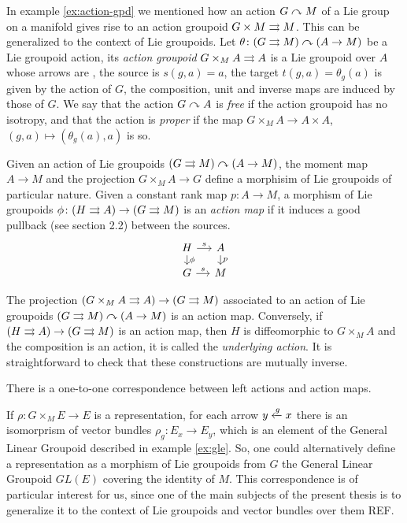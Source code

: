 In example \ref{ex:action-gpd} we mentioned how an action $G\curvearrowright M$ of a Lie group on a manifold gives rise to an action groupoid $G\times M\rightrightarrows M$.
This can be generalized to the context of Lie groupoids.
Let $\theta\colon (G\rightrightarrows M)\curvearrowright (A\to M)$ be a Lie groupoid action, its \emph{action groupoid} \(G\times_M A\rightrightarrows A\) is a Lie groupoid over $A$ whose arrows are ,
the source is $s(g,a) = a$, the target $t(g,a) = \theta_g(a)$ is given by the action of $G$, the composition, unit and inverse maps are induced by those of $G$.
We say that the action $G\curvearrowright A$ is \emph{free} if the action groupoid has no isotropy, and that the action is \emph{proper} if the map $G \times_M A \to A\times A$, $(g,a)\mapsto (\theta_g(a),a)$ is so.

Given an action of Lie groupoids $(G\rightrightarrows M)\curvearrowright (A\to M)$, the moment map $A\to M$ and the projection $G\times_M A\to G$ define a morphisim of Lie groupoids of particular nature.
Given a constant rank map $p\colon A\to M$, a morphism of Lie groupoids $\phi\colon(H\rightrightarrows A)\to (G\rightrightarrows M)$ is an \emph{action map} if it induces a good pullback (see \cite{dh13} section 2.2) between the sources.
\begin{equation}
\begin{tikzcd}[sep = small]
  H \ar{r}{s} \ar{d}{\phi} & A \ar{d}{p} \\
  G \ar{r}{s} & M
\end{tikzcd}
\end{equation}

The projection \((G\times_M A\rightrightarrows A)\to (G\rightrightarrows M)\) associated to an action of Lie groupoids $(G\rightrightarrows M)\curvearrowright (A\to M)$ is an action map.
Conversely, if $(H\rightrightarrows A)\to (G\rightrightarrows M)$ is an action map, then $H$ is diffeomorphic to $G\times_M A$ and the composition  is an action, it is called the \emph{underlying action}.
It is straightforward to check that these constructions are mutually inverse.

\begin{prop}
There is a one-to-one correspondence between left actions and action maps.
\end{prop}

If $\rho\colon G\times_ME\to E$ is a representation, for each arrow $y\xleftarrow g x$ there is an isomorprism of vector bundles $\rho_g\colon E_x\to E_y$, which is an element of the General Linear Groupoid described in example \ref{ex:gle}.
So, one could alternatively define a representation as a morphism of Lie groupoids from $G$ the General Linear Groupoid $GL(E)$ covering the identity of $M$.
This correspondence is of particular interest for us, since one of the main subjects of the present thesis is to generalize it to the context of Lie groupoids and vector bundles over them REF.

